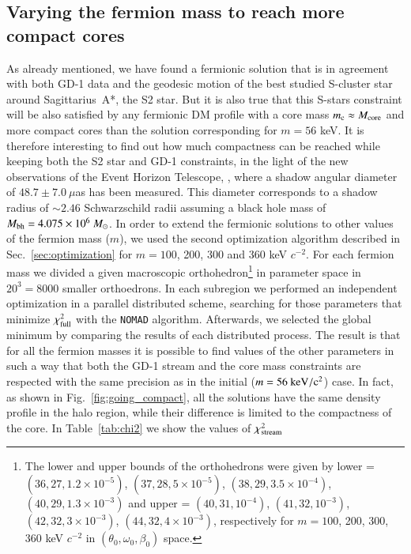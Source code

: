 \documentclass[twocolumn]{aa}
\begin{document}
\subsection{Varying the fermion mass to reach more compact cores}
As already mentioned, we have found a fermionic solution that is in agreement with both GD-1 data and
the geodesic motion of the best studied S-cluster star around Sagittarius~A*, the S2 star. But it is also true that this S-stars constraint will be also satisfied by any fermionic DM profile
with a core mass $m_\mathrm{c}\approx M_{\rm{core}}$ and more compact cores than the solution corresponding for $m=56$ keV. It is therefore interesting to find out how much compactness can be reached
while keeping both the S2 star and \hbox{GD-1} constraints, in the light of the new observations
of the Event Horizon Telescope, \cite{EHT_image}, where a shadow angular diameter of $48.7\pm7.0~\mu$as
has been measured. This diameter corresponds to a shadow radius of $\sim 2.46$ Schwarzschild radii assuming
a black hole mass of $M_{\rm{bh}}=4.075\times10^6~M_\odot$.
In order to extend the fermionic solutions to other values of the fermion mass ($m$), we used the second optimization algorithm described in Sec.~\ref{sec:optimization} for $m=100$, 200, 300 and 360 keV $c^{-2}$. For each fermion mass we divided a given macroscopic orthohedron\footnote{The lower and upper bounds of the orthohedrons were given by
lower = $(36, 27, 1.2\times10^{-5})$, $(37, 28, 5\times10^{-5})$, $(38, 29, 3.5\times10^{-4})$, $(40, 29, 1.3\times10^{-3})$ and
upper = $(40, 31, 10^{-4})$, $(41, 32, 10^{-3})$, $(42, 32, 3\times10^{-3})$, $(44, 32, 4\times10^{-3})$, respectively for $m=100$, 200, 300, 360 keV $c^{-2}$ in $(\theta_0, \omega_0, \beta_0)$ space.} 
in parameter space in $20^3=8000$ smaller orthoedrons. In each subregion we performed an independent optimization in a parallel distributed scheme, searching for those parameters that minimize $\chi^2_{\rm{full}}$ with the \texttt{NOMAD} algorithm. Afterwards, we selected the global minimum by comparing the results of each distributed process.
The result is that for all the fermion masses it is possible to find values of the other parameters in such a way that both the GD-1 stream and the core mass constraints  are respected with the same precision as in the initial ($m=56~\rm{keV}/c^2$) case. In fact, as shown in Fig.~\ref{fig:going_compact}, all the solutions have the same density profile in the halo region, while their difference is limited to the compactness of the core.
In Table~\ref{tab:chi2} we show the values of $\chi^2_{\rm{stream}}$
\end{document}
